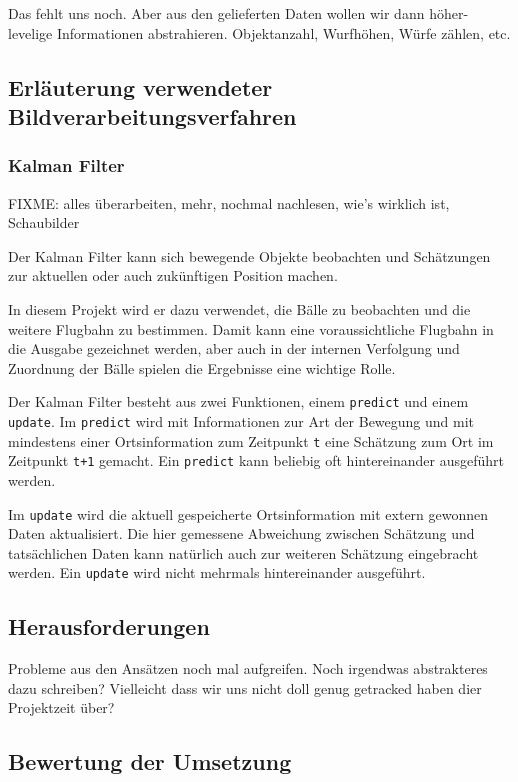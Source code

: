 \documentclass[12pt,a4paper,ngerman]{scrartcl}
\begin{document}
Das fehlt uns noch. Aber aus den gelieferten Daten wollen wir dann höher-levelige Informationen abstrahieren. Objektanzahl, Wurfhöhen, Würfe zählen, etc.

\subsection{Erläuterung verwendeter Bildverarbeitungsverfahren}

\subsubsection{Kalman Filter}

{\color{red} FIXME: alles überarbeiten, mehr, nochmal nachlesen, wie's wirklich ist, Schaubilder}

Der Kalman Filter kann sich bewegende Objekte beobachten und Schätzungen zur aktuellen oder auch zukünftigen Position machen.

In diesem Projekt wird er dazu verwendet, die Bälle zu beobachten und die weitere Flugbahn zu bestimmen. Damit kann eine voraussichtliche Flugbahn in die Ausgabe gezeichnet werden, aber auch in der internen Verfolgung und Zuordnung der Bälle spielen die Ergebnisse eine wichtige Rolle.

Der Kalman Filter besteht aus zwei Funktionen, einem {\tt predict} und einem {\tt update}. Im {\tt predict} wird mit Informationen zur Art der Bewegung und mit mindestens einer Ortsinformation zum Zeitpunkt {\tt t} eine Schätzung zum Ort im Zeitpunkt {\tt t+1} gemacht. Ein {\tt predict} kann beliebig oft hintereinander ausgeführt werden.

Im {\tt update} wird die aktuell gespeicherte Ortsinformation mit extern gewonnen Daten aktualisiert. Die hier gemessene Abweichung zwischen Schätzung und tatsächlichen Daten kann natürlich auch zur weiteren Schätzung eingebracht werden. Ein {\tt update} wird nicht mehrmals hintereinander ausgeführt.

\subsection{Herausforderungen}

Probleme aus den Ansätzen noch mal aufgreifen. Noch irgendwas abstrakteres dazu schreiben? Vielleicht dass wir uns nicht doll genug getracked haben dier Projektzeit über?

\subsection{Bewertung der Umsetzung}
\end{document}

